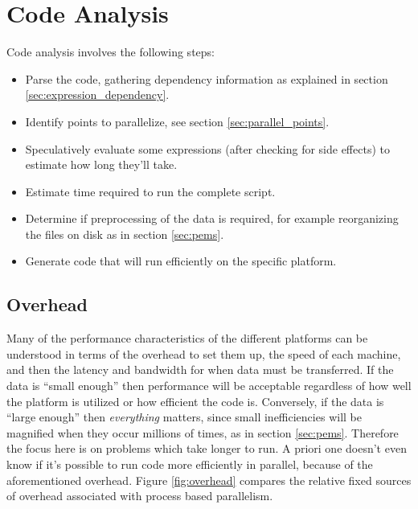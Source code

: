 \documentclass[12pt]{article}
\begin{document}

\section{Code Analysis}

Code analysis involves the following steps:

\begin{itemize}
    \item Parse the code, gathering dependency information as explained in
        section \ref{sec:expression_dependency}.



    \item Identify points to parallelize, see section
        \ref{sec:parallel_points}.
    \item Speculatively evaluate some expressions (after checking for side
        effects) to estimate how long they'll take.
    \item Estimate time required to run the complete script.
    \item Determine if preprocessing of the data is required, for example
        reorganizing the files on disk as in section \ref{sec:pems}.
    \item Generate code that will run efficiently on the specific platform.
\end{itemize}

\subsection{Overhead}

Many of the performance characteristics of the different platforms can be
understood in terms of the overhead to set them up, the speed of each
machine, and then the latency and bandwidth for when data must be
transferred.  If the data is ``small enough'' then performance will be
acceptable regardless of how well the platform is utilized or how efficient
the code is. Conversely, if the data is ``large enough'' then
\emph{everything} matters, since small inefficiencies will be magnified
when they occur millions of times, as in section \ref{sec:pems}.  Therefore
the focus here is on problems which take longer to run. A priori one
doesn't even know if it's possible to run code more efficiently in
parallel, because of the aforementioned overhead.
Figure \ref{fig:overhead} compares the relative fixed sources of overhead
associated with process based parallelism.
\end{document}
